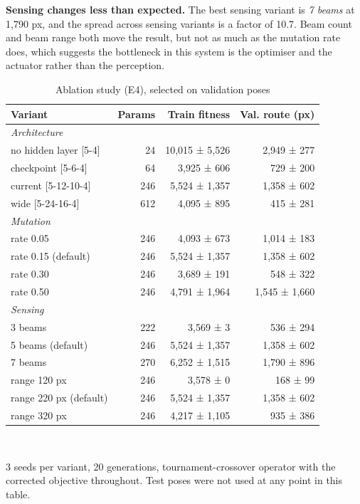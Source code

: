 \documentclass[conference]{IEEEtran}
\begin{document}
\textbf{Sensing changes less than expected.} The best sensing variant is \emph{7 beams} at 1,790 px, and the spread across sensing variants is a factor of 10.7. Beam count and beam range both move the result, but not as much as the mutation rate does, which suggests the bottleneck in this system is the optimiser and the actuator rather than the perception.

\begin{table}[!t]
\caption{Ablation study (E4), selected on validation poses}
\label{tab:ablation}
\centering
\footnotesize
\begin{tabular}{lrrr}
\toprule
Variant & Params & Train fitness & Val. route (px) \\
\midrule
\multicolumn{4}{l}{\emph{Architecture}} \\
no hidden layer [5-4] & 24 & 10,015 ± 5,526 & 2,949 ± 277 \\
checkpoint [5-6-4] & 64 & 3,925 ± 606 & 729 ± 200 \\
current [5-12-10-4] & 246 & 5,524 ± 1,357 & 1,358 ± 602 \\
wide [5-24-16-4] & 612 & 4,095 ± 895 & 415 ± 281 \\
\multicolumn{4}{l}{\emph{Mutation}} \\
rate 0.05 & 246 & 4,093 ± 673 & 1,014 ± 183 \\
rate 0.15 (default) & 246 & 5,524 ± 1,357 & 1,358 ± 602 \\
rate 0.30 & 246 & 3,689 ± 191 & 548 ± 322 \\
rate 0.50 & 246 & 4,791 ± 1,964 & 1,545 ± 1,660 \\
\multicolumn{4}{l}{\emph{Sensing}} \\
3 beams & 222 & 3,569 ± 3 & 536 ± 294 \\
5 beams (default) & 246 & 5,524 ± 1,357 & 1,358 ± 602 \\
7 beams & 270 & 6,252 ± 1,515 & 1,790 ± 896 \\
range 120 px & 246 & 3,578 ± 0 & 168 ± 99 \\
range 220 px (default) & 246 & 5,524 ± 1,357 & 1,358 ± 602 \\
range 320 px & 246 & 4,217 ± 1,105 & 935 ± 386 \\
\bottomrule
\end{tabular}
\\[2pt]\parbox{\linewidth}{\scriptsize 3 seeds per variant, 20 generations, tournament-crossover operator with the corrected objective throughout. Test poses were not used at any point in this table.}
\end{table}
\end{document}
